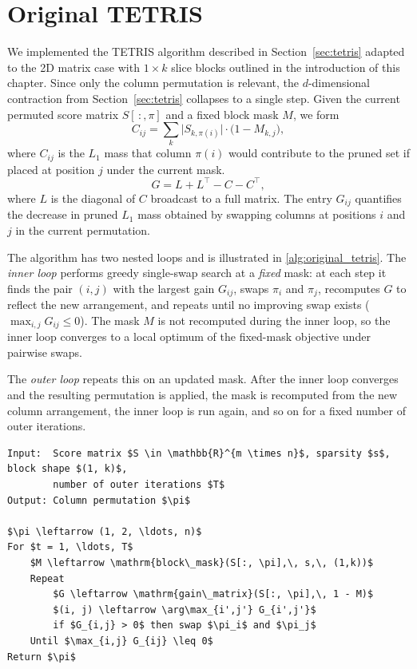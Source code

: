 \section{Original TETRIS}
\label{sec:original_tetris}

We implemented the TETRIS algorithm described in Section~\ref{sec:tetris} adapted to the 2D matrix case with $1 \times k$ slice blocks outlined in the introduction of this chapter. Since only the column permutation is relevant, the $d$-dimensional contraction from Section~\ref{sec:tetris} collapses to a single step. Given the current permuted score matrix $S[\,:,\pi]$ and a fixed block mask $M$, we form
$$ C_{ij} = \sum_{k} \big|S_{k, \pi(i)}\big| \cdot \bigl(1 - M_{k, j}\bigr), $$
where $C_{ij}$ is the $L_1$ mass that column $\pi(i)$ would contribute to the pruned set if placed at position $j$ under the current mask.
$$ G = L + L^\top - C - C^\top, $$
where $L$ is the diagonal of $C$ broadcast to a full matrix. The entry $G_{ij}$ quantifies the decrease in pruned $L_1$ mass obtained by swapping columns at positions $i$ and $j$ in the current permutation.

The algorithm has two nested loops and is illustrated in \ref{alg:original_tetris}. The \emph{inner loop} performs greedy single-swap search at a \emph{fixed} mask: at each step it finds the pair $(i, j)$ with the largest gain $G_{ij}$, swaps $\pi_i$ and $\pi_j$, recomputes $G$ to reflect the new arrangement, and repeats until no improving swap exists ($\max_{i,j} G_{ij} \leq 0$). The mask $M$ is not recomputed during the inner loop, so the inner loop converges to a local optimum of the fixed-mask objective under pairwise swaps.

The \emph{outer loop} repeats this on an updated mask. After the inner loop converges and the resulting permutation is applied, the mask is recomputed from the new column arrangement, the inner loop is run again, and so on for a fixed number of outer iterations.

\begin{lstlisting}[style=pseudocode,
                   caption={Original TETRIS (2D score matrix with column permutation specialization)},
                   label={alg:original_tetris}]
Input:  Score matrix $S \in \mathbb{R}^{m \times n}$, sparsity $s$, block shape $(1, k)$,
        number of outer iterations $T$
Output: Column permutation $\pi$

$\pi \leftarrow (1, 2, \ldots, n)$
For $t = 1, \ldots, T$
    $M \leftarrow \mathrm{block\_mask}(S[:, \pi],\, s,\, (1,k))$
    Repeat
        $G \leftarrow \mathrm{gain\_matrix}(S[:, \pi],\, 1 - M)$
        $(i, j) \leftarrow \arg\max_{i',j'} G_{i',j'}$
        if $G_{i,j} > 0$ then swap $\pi_i$ and $\pi_j$
    Until $\max_{i,j} G_{ij} \leq 0$
Return $\pi$
\end{lstlisting}

